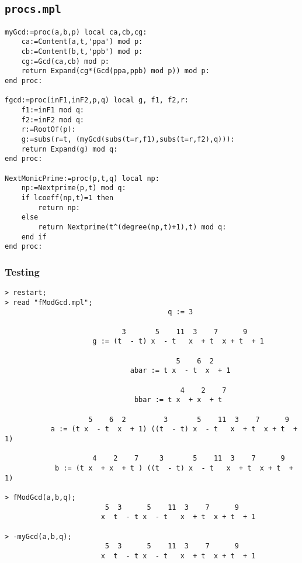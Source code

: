 \documentclass[10pt]{report}
\theoremstyle{plain}
\theoremstyle{definition}
\begin{document}
\subsection*{\tt{procs.mpl}}
\begin{verbatim}
myGcd:=proc(a,b,p) local ca,cb,cg:
    ca:=Content(a,t,'ppa') mod p:
    cb:=Content(b,t,'ppb') mod p:
    cg:=Gcd(ca,cb) mod p:
    return Expand(cg*(Gcd(ppa,ppb) mod p)) mod p:
end proc:

fgcd:=proc(inF1,inF2,p,q) local g, f1, f2,r:
    f1:=inF1 mod q:
    f2:=inF2 mod q:
    r:=RootOf(p):
    g:=subs(r=t, (myGcd(subs(t=r,f1),subs(t=r,f2),q))):
    return Expand(g) mod q:
end proc:

NextMonicPrime:=proc(p,t,q) local np:
    np:=Nextprime(p,t) mod q:
    if lcoeff(np,t)=1 then 
        return np:
    else
        return Nextprime(t^(degree(np,t)+1),t) mod q:
    end if
end proc:
\end{verbatim}

\clearpage
\subsubsection*{Testing}

\begin{verbatim}
> restart;
> read "fModGcd.mpl";
                                       q := 3

                            3       5    11  3    7      9
                     g := (t  - t) x  - t   x  + t  x + t  + 1

                                         5    6  2
                              abar := t x  - t  x  + 1

                                          4    2    7
                               bbar := t x  + x  + t

                    5    6  2         3       5    11  3    7      9
           a := (t x  - t  x  + 1) ((t  - t) x  - t   x  + t  x + t  + 1)

                     4    2    7     3       5    11  3    7      9
            b := (t x  + x  + t ) ((t  - t) x  - t   x  + t  x + t  + 1)

> fModGcd(a,b,q);
                        5  3      5    11  3    7      9
                       x  t  - t x  - t   x  + t  x + t  + 1

> -myGcd(a,b,q);
                        5  3      5    11  3    7      9
                       x  t  - t x  - t   x  + t  x + t  + 1
\end{verbatim}
\end{document}
